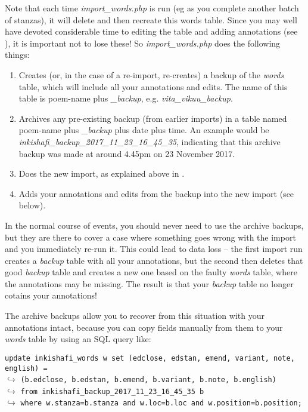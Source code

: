 Note that each time \textit{import_words.php} is run (eg as you complete another batch of stanzas), it will delete and then recreate this words table.  Since you may well have devoted considerable time to editing the table and adding annotations (see ), it is important not to lose these!  So \textit{import_words.php} does the following things:
\begin{enumerate}
\item Creates (or, in the case of a re-import, re-creates) a backup of the \textit{words} table, which will include all your annotations and edits.  The name of this table is poem-name plus \textit{_backup}, e.g. \textit{vita_vikuu_backup}.
\item Archives any pre-existing backup (from earlier imports) in a table named poem-name plus \textit{_backup} plus date plus time.  An example would be \textit{inkishafi_backup_2017_11_23_16_45_35}, indicating that this archive backup was made at around 4.45pm on 23 November 2017.
\item Does the new import, as explained above in .
\item Adds your annotations and edits from the backup into the new import (see  below).
\end{enumerate}

In the normal course of events, you should never need to use the archive backups, but they are there to cover a case where something goes wrong with the import and you immediately re-run it.  This could lead to data loss -- the first import run creates a \textit{backup} table with all your annotations, but the second then deletes that good \textit{backup} table and creates a new one based on the faulty \textit{words} table, where the annotations may be missing.  The result is that your \textit{backup} table no longer cotains your annotations!  

The archive backups allow you to recover from this situation with your annotations intact, because you can copy fields manually from them to your \textit{words} table by using an SQL query like:

\verb|update inkishafi_words w set (edclose, edstan, emend, variant, note, english) = |\\
$\hookrightarrow$ \verb|(b.edclose, b.edstan, b.emend, b.variant, b.note, b.english)|\\
$\hookrightarrow$ \verb|from inkishafi_backup_2017_11_23_16_45_35 b|\\
$\hookrightarrow$ \verb|where w.stanza=b.stanza and w.loc=b.loc and w.position=b.position;|

